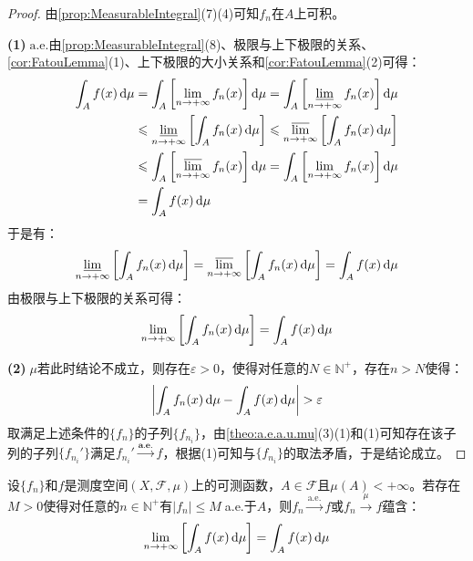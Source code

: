 \begin{proof}
	由\cref{prop:MeasurableIntegral}(7)(4)可知$f_n$在$A$上可积。\par
	\textbf{(1)$\;\text{a.e.}$}由\cref{prop:MeasurableIntegral}(8)、极限与上下极限的关系、\cref{cor:FatouLemma}(1)、上下极限的大小关系和\cref{cor:FatouLemma}(2)可得：
	\begin{align*}
		\int_{A}f(x)\dif\mu&=\int_{A}\left[\lim_{n\to+\infty}f_n(x)\right]\dif\mu=\int_{A}\left[\varliminf_{n\to+\infty}f_n(x)\right]\dif\mu \\
		&\leqslant\varliminf_{n\to+\infty}\left[\int_{A}f_n(x)\dif\mu\right]\leqslant\varlimsup_{n\to+\infty}\left[\int_{A}f_n(x)\dif\mu\right] \\
		&\leqslant\int_{A}\left[\varlimsup_{n\to+\infty}f_n(x)\right]\dif\mu=\int_{A}\left[\lim_{n\to+\infty}f_n(x)\right]\dif\mu \\
		&=\int_{A}f(x)\dif\mu
	\end{align*}
	于是有：
	\begin{equation*}
		\varliminf_{n\to+\infty}\left[\int_{A}f_n(x)\mathop{}\!\mathrm{d}\mu\right]=\varlimsup_{n\to+\infty}\left[\int_{A}f_n(x)\mathop{}\!\mathrm{d}\mu\right]=\int_{A}f(x)\mathop{}\!\mathrm{d}\mu
	\end{equation*}
	由极限与上下极限的关系可得：
	\begin{equation*}
		\lim_{n\to+\infty}\left[\int_{A}f_n(x)\mathop{}\!\mathrm{d}\mu\right]=\int_{A}f(x)\mathop{}\!\mathrm{d}\mu
	\end{equation*}\par
	\textbf{(2)$\;\mu$}若此时结论不成立，则存在$\varepsilon>0$，使得对任意的$N\in\mathbb{N}^+$，存在$n>N$使得：
	\begin{equation*}
		\left|\int_{A}f_n(x)\dif\mu-\int_{A}f(x)\dif\mu\right|>\varepsilon
	\end{equation*}
	取满足上述条件的$\{f_n\}$的子列$\{f_{n_i}\}$，由\cref{theo:a.e.a.u.mu}(3)(1)和(1)可知存在该子列的子列$\{f_{n_i}'\}$满足$f_{n_i}'\overset{\textbf{a.e.}}{\longrightarrow}f$，根据(1)可知与$\{f_{n_i}\}$的取法矛盾，于是结论成立。
\end{proof}
\begin{corollary}[Lebesgue有界收敛定理]
	设$\{f_n\}$和$f$是测度空间$(X,\mathscr{F},\mu)$上的可测函数，$A\in\mathscr{F}$且$\mu(A)<+\infty$。若存在$M>0$使得对任意的$n\in\mathbb{N}^+$有$|f_n|\leqslant M\;$a.e.于$A$，则$f_n\overset{\text{a.e.}}{\longrightarrow}f$或$f_n\overset{\mu}{\longrightarrow}f$蕴含：
	\begin{equation*}
		\lim_{n\to+\infty}\left[\int_{A}f(x)\mathop{}\!\mathrm{d}\mu\right]=\int_{A}f(x)\mathop{}\!\mathrm{d}\mu
	\end{equation*}
\end{corollary}
